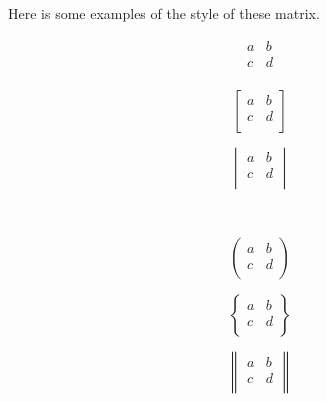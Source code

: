 \begin{frame}
	Here is some examples of the style of these matrix.
	\begin{example}
		\begin{minipage}{0.3\linewidth}
			\centering {}
			$$\begin{matrix}a&b\\c&d\\\end{matrix}$$
		\end{minipage}
		\hfill
		\begin{minipage}{0.3\linewidth}
			\centering {}
			$$\begin{bmatrix}a&b\\c&d\\\end{bmatrix}$$
		\end{minipage}
		\hfill
		\begin{minipage}{0.3\linewidth}
			\centering {}
			$$\begin{vmatrix}a&b\\c&d\\\end{vmatrix}$$
		\end{minipage}
		\vfill
		\ \\[1em]
		\begin{minipage}{0.3\linewidth}
			\centering {}
			$$\begin{pmatrix}a&b\\c&d\\\end{pmatrix}$$
		\end{minipage}
		\hfill
		\begin{minipage}{0.3\linewidth}
			\centering {}
			$$\begin{Bmatrix}a&b\\c&d\\\end{Bmatrix}$$
		\end{minipage}
		\hfill
		\begin{minipage}{0.3\linewidth}
			\centering {}
			$$\begin{Vmatrix}a&b\\c&d\\\end{Vmatrix}$$
		\end{minipage}
	\end{example}
\end{frame}

